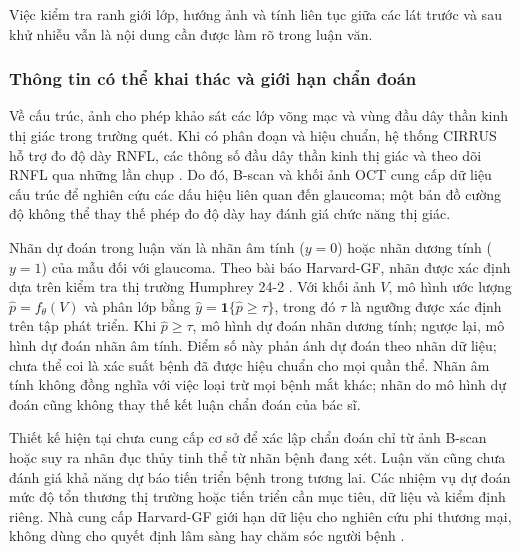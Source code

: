 \documentclass[14pt,a4paper,oneside]{extreport}
\begin{document}
Việc kiểm tra ranh giới lớp, hướng ảnh và tính liên tục giữa các lát
trước và sau khử nhiễu vẫn là nội dung cần được làm rõ trong luận văn.

\subsubsection{Thông tin có thể khai thác và giới hạn chẩn đoán}
Về cấu trúc, ảnh cho phép khảo sát các lớp võng mạc và vùng đầu dây
thần kinh thị giác trong trường quét. Khi có phân đoạn và hiệu chuẩn,
hệ thống CIRRUS hỗ trợ đo độ dày RNFL, các thông số đầu dây thần kinh
thị giác và theo dõi RNFL qua những lần chụp \cite{zeiss2015cirrus}.
Do đó, B-scan và khối ảnh OCT cung cấp dữ liệu cấu trúc để nghiên cứu
các dấu hiệu liên quan đến glaucoma; một bản đồ cường độ không thể thay
thế phép đo độ dày hay đánh giá chức năng thị giác.

Nhãn dự đoán trong luận văn là nhãn âm tính ($y=0$) hoặc nhãn dương
tính ($y=1$) của mẫu đối với glaucoma. Theo bài báo Harvard-GF, nhãn được
xác định dựa trên kiểm tra thị trường Humphrey 24-2
\cite{luo2024harvardgf}. Với khối ảnh $V$, mô hình ước lượng
$\widehat p=f_\theta(V)$ và phân lớp bằng
$\widehat y=\boldsymbol{1}\{\widehat p\geq\tau\}$, trong đó $\tau$
là ngưỡng được xác định trên tập phát triển. Khi $\widehat p\geq\tau$, mô hình
dự đoán nhãn dương tính; ngược lại, mô hình dự đoán nhãn âm tính.
Điểm số này phản ánh dự đoán theo nhãn dữ liệu; chưa thể coi là xác
suất bệnh đã được hiệu chuẩn cho mọi quần thể. Nhãn âm tính không
đồng nghĩa với việc loại trừ mọi bệnh mắt khác; nhãn do mô hình dự
đoán cũng không thay thế kết luận chẩn đoán của bác sĩ.

Thiết kế hiện tại chưa cung cấp cơ sở để xác lập chẩn đoán chỉ từ ảnh
B-scan hoặc suy ra nhãn đục thủy tinh thể từ nhãn bệnh đang xét.
Luận văn cũng chưa đánh giá khả năng dự báo tiến triển bệnh trong tương lai.
Các nhiệm vụ dự đoán mức độ tổn thương thị trường hoặc tiến triển
cần mục tiêu, dữ liệu và kiểm định riêng. Nhà cung cấp Harvard-GF
giới hạn dữ liệu cho nghiên cứu phi thương mại, không dùng cho quyết
định lâm sàng hay chăm sóc người bệnh \cite{harvardgfRepo}.
\end{document}
